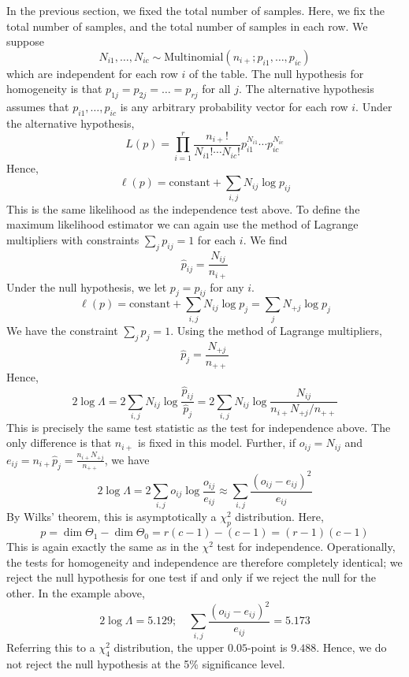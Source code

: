 \begin{example}
	In the previous section, we fixed the total number of samples.
	Here, we fix the total number of samples, and the total number of samples in each row.
	We suppose
	\[ N_{i1}, \dots, N_{ic} \sim \mathrm{Multinomial}(n_{i+}; p_{i1}, \dots, p_{ic}) \]
	which are independent for each row \( i \) of the table.
	The null hypothesis for homogeneity is that \( p_{1j} = p_{2j} = \dots = p_{rj} \) for all \( j \).
	The alternative hypothesis assumes that \( p_{i1}, \dots, p_{ic} \) is any arbitrary probability vector for each row \( i \).
	Under the alternative hypothesis,
	\[ L(p) = \prod_{i=1}^r \frac{n_{i+}!}{N_{i1}! \cdots N_{ic}!} p_{i1}^{N_{i1}} \cdots p_{ic}^{N_{ic}} \]
	Hence,
	\[ \ell(p) = \text{constant} + \sum_{i,j} N_{ij} \log p_{ij} \]
	This is the same likelihood as the independence test above.
	To define the maximum likelihood estimator we can again use the method of Lagrange multipliers with constraints \( \sum_j p_{ij} = 1 \) for each \( i \).
	We find
	\[ \hat p_{ij} = \frac{N_{ij}}{n_{i+}} \]
	Under the null hypothesis, we let \( p_j = p_{ij} \) for any \( i \).
	\[ \ell(p) = \text{constant} + \sum_{i,j} N_{ij} \log p_j = \sum_j N_{+j} \log p_j \]
	We have the constraint \( \sum_j p_j = 1 \).
	Using the method of Lagrange multipliers,
	\[ \hat p_j = \frac{N_{+j}}{n_{++}} \]
	Hence,
	\[ 2 \log \Lambda = 2 \sum_{i,j} N_{ij} \log \frac{\hat p_{ij}}{\hat p_j} = 2 \sum_{i,j} N_{ij} \log \frac{N_{ij}}{n_{i+} N_{+j} / n_{++}} \]
	This is precisely the same test statistic as the test for independence above.
	The only difference is that \( n_{i+} \) is fixed in this model.
	Further, if \( o_{ij} = N_{ij} \) and \( e_{ij} = n_{i+} \hat p_j = \frac{n_{i+} N_{+j}}{n_{++}} \), we have
	\[ 2 \log \Lambda = 2 \sum_{i,j} o_{ij} \log \frac{o_{ij}}{e_{ij}} \approx \sum_{i,j} \frac{(o_{ij} - e_{ij})^2}{e_{ij}} \]
	By Wilks' theorem, this is asymptotically a \( \chi^2_p \) distribution.
	Here,
	\[ p = \dim \Theta_1 - \dim \Theta_0 = r(c-1) - (c-1) = (r-1)(c-1) \]
	This is again exactly the same as in the \( \chi^2 \) test for independence.
	Operationally, the tests for homogeneity and independence are therefore completely identical; we reject the null hypothesis for one test if and only if we reject the null for the other.
	In the example above,
	\[ 2 \log \Lambda = 5.129;\quad \sum_{i,j} \frac{(o_{ij} - e_{ij})^2}{e_{ij}} = 5.173 \]
	Referring this to a \( \chi^2_4 \) distribution, the upper \( 0.05 \)-point is \( 9.488 \).
	Hence, we do not reject the null hypothesis at the 5\% significance level.
\end{example}

